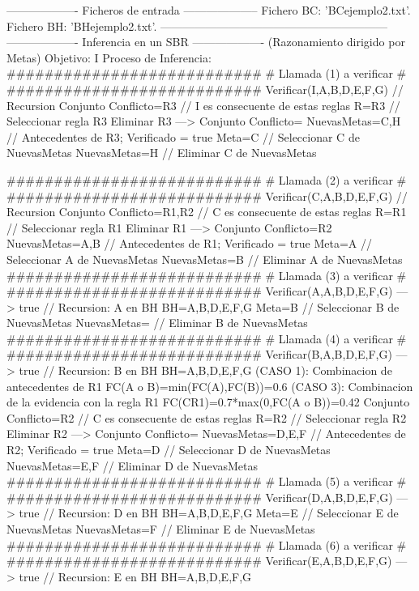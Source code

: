 \begin{listing}[language=Pascal]
------------------- Ficheros de entrada --------------------
Fichero BC: 'BCejemplo2.txt'.
Fichero BH: 'BHejemplo2.txt'.
------------------------------------------------------------
------------------- Inferencia en un SBR -------------------
	(Razonamiento dirigido por Metas)
	Objetivo: I
	Proceso de Inferencia: 
	  ###########################
	  # Llamada (1) a verificar #
	  ###########################
		Verificar(I,{A,B,D,E,F,G}) // Recursion 
		Conjunto Conflicto={R3} // I es consecuente de estas reglas
		R={R3} // Seleccionar regla R3
		Eliminar R3 ---> Conjunto Conflicto={}
		NuevasMetas={C,H} // Antecedentes de R3; Verificado = true
		Meta=C // Seleccionar C de NuevasMetas
		NuevasMetas={H} // Eliminar C de NuevasMetas
	
	  ###########################
	  # Llamada (2) a verificar #
	  ###########################
		Verificar(C,{A,B,D,E,F,G}) // Recursion 
		Conjunto Conflicto={R1,R2} // C es consecuente de estas reglas
		R={R1} // Seleccionar regla R1
		Eliminar R1 ---> Conjunto Conflicto={R2}
		NuevasMetas={A,B} // Antecedentes de R1; Verificado = true
		Meta=A // Seleccionar A de NuevasMetas
		NuevasMetas={B} // Eliminar A de NuevasMetas
	  ###########################
	  # Llamada (3) a verificar #
	  ###########################
		Verificar(A,{A,B,D,E,F,G}) ---> true // Recursion: A en BH
		BH={A,B,D,E,F,G}
		Meta=B // Seleccionar B de NuevasMetas
		NuevasMetas={} // Eliminar B de NuevasMetas
	  ###########################
	  # Llamada (4) a verificar #
	  ###########################
		Verificar(B,{A,B,D,E,F,G}) ---> true // Recursion: B en BH
		BH={A,B,D,E,F,G}
		(CASO 1): Combinacion de antecedentes de R1
		 FC(A o B)=min(FC(A),FC(B))=0.6
		(CASO 3): Combinacion de la evidencia con la regla R1
		 FC(C{R1})=0.7*max(0,FC(A o B))=0.42
		Conjunto Conflicto={R2} // C es consecuente de estas reglas
		R={R2} // Seleccionar regla R2
		Eliminar R2 ---> Conjunto Conflicto={}
		NuevasMetas={D,E,F} // Antecedentes de R2; Verificado = true
		Meta=D // Seleccionar D de NuevasMetas
		NuevasMetas={E,F} // Eliminar D de NuevasMetas
	  ###########################
	  # Llamada (5) a verificar #
	  ###########################
		Verificar(D,{A,B,D,E,F,G}) ---> true // Recursion: D en BH
		BH={A,B,D,E,F,G}
		Meta=E // Seleccionar E de NuevasMetas
		NuevasMetas={F} // Eliminar E de NuevasMetas
	  ###########################
	  # Llamada (6) a verificar #
	  ###########################
		Verificar(E,{A,B,D,E,F,G}) ---> true // Recursion: E en BH
		BH={A,B,D,E,F,G}

\end{listing}
